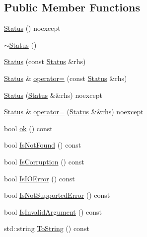 \subsection*{Public Member Functions}
\begin{DoxyCompactItemize}
\item 
\mbox{\hyperlink{classleveldb_1_1_status_a01e02f5736b96f1b1e58bbcb0c98bf92}{Status}} () noexcept
\item 
\mbox{\hyperlink{classleveldb_1_1_status_a5f36252202fb791ef8312fe848ffceb3}{$\sim$\+Status}} ()
\item 
\mbox{\hyperlink{classleveldb_1_1_status_aa9c1250e3cf41da64347a3de85e3f0a3}{Status}} (const \mbox{\hyperlink{classleveldb_1_1_status}{Status}} \&rhs)
\item 
\mbox{\hyperlink{classleveldb_1_1_status}{Status}} \& \mbox{\hyperlink{classleveldb_1_1_status_a6c7bc85cbe92cba9146e269286838557}{operator=}} (const \mbox{\hyperlink{classleveldb_1_1_status}{Status}} \&rhs)
\item 
\mbox{\hyperlink{classleveldb_1_1_status_a3e2257b373226d0294cdd8ae73615388}{Status}} (\mbox{\hyperlink{classleveldb_1_1_status}{Status}} \&\&rhs) noexcept
\item 
\mbox{\hyperlink{classleveldb_1_1_status}{Status}} \& \mbox{\hyperlink{classleveldb_1_1_status_a70ba77aa00b1c1c26aa2a59010723284}{operator=}} (\mbox{\hyperlink{classleveldb_1_1_status}{Status}} \&\&rhs) noexcept
\item 
bool \mbox{\hyperlink{classleveldb_1_1_status_af988e2a8d204019c14f21126d9300362}{ok}} () const
\item 
bool \mbox{\hyperlink{classleveldb_1_1_status_ad4c0469a76324aeb01d96db8bf95737d}{Is\+Not\+Found}} () const
\item 
bool \mbox{\hyperlink{classleveldb_1_1_status_a83077fd4bb808556e6290a25187e2cb3}{Is\+Corruption}} () const
\item 
bool \mbox{\hyperlink{classleveldb_1_1_status_a54c6da2f81ae0dff8bc6cea605ce1de6}{Is\+I\+O\+Error}} () const
\item 
bool \mbox{\hyperlink{classleveldb_1_1_status_a2cca03c2723fc37c43df2b9e095f56bc}{Is\+Not\+Supported\+Error}} () const
\item 
bool \mbox{\hyperlink{classleveldb_1_1_status_a104680c351113a93b9c8d2b23f88d87e}{Is\+Invalid\+Argument}} () const
\item 
std\+::string \mbox{\hyperlink{classleveldb_1_1_status_a9bd26a7abfa28b572a4f38732bf9218a}{To\+String}} () const
\end{DoxyCompactItemize}
